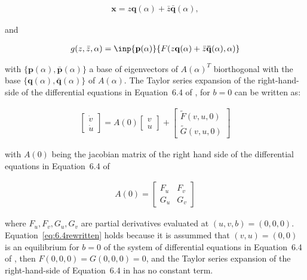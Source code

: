 \documentclass{article}
\theoremstyle{lemma}
\begin{document}
\begin{align}
\mathbf{x}=z\mathbf{q}(\alpha)+\bar{z}\mathbf{\bar{q}}(\alpha),
\label{eq:xExpandedOnz}
\end{align}

\noindent and 

\begin{align}
g(z,\bar{z},\alpha)=\inp{\mathbf{p}(\alpha)}{F(z\mathbf{q}(\alpha)+\bar{z}\mathbf{\bar{q}}(\alpha),\alpha)}\label{eq:gAtz}
\end{align}

\noindent with $\{\mathbf{p}(\alpha),\mathbf{\bar{p}}(\alpha)\}$ a base of
eigenvectors of $A(\alpha)^T$ biorthogonal with the base
$\{\mathbf{q}(\alpha),\mathbf{\bar{q}}(\alpha)\}$ of $A(\alpha)$.
The Taylor series expansion of the right-hand-side of the differential
equations in Equation~6.4 of \citet{izhikevich07}, for $b=0$
can be written as:

\begin{align}
\left[\begin{array}{c}
        \dot{v}\\
        \dot{u}
       \end{array}\right] = A(0) \left[\begin{array}{c}
                                         v\\
                                         u
                                        \end{array}\right] +
                            \left[\begin{array}{c}
                                    \tilde{F}(v, u, 0)\\
                                    \tilde{G}(v, u, 0)
                                   \end{array}\right]
\label{eq:6.4rewritten}
\end{align}

\noindent with $A(0)$ being the jacobian matrix of the right hand side of the
differential equations in Equation~6.4 of \citet{izhikevich07}

\begin{align}
A(0)=\left[\begin{array}{cc}
                F_u & F_v\\
                G_u & G_v
           \end{array}\right]
\label{eq:jacobian}
\end{align}

\noindent where $F_u,F_v,G_u,G_v$ are partial derivatives evaluated at
$(u,v,b)=(0,0,0)$. Equation~\ref{eq:6.4rewritten} holds because it is assummed
that $(v,u)=(0,0)$ is an equilibrium for $b=0$ of the system of differential
equations in Equation~6.4 of \citet{izhikevich07}, then
$F(0,0,0)=G(0,0,0)=0$, and the Taylor series expansion of the right-hand-side
of Equation~6.4 in \citet{izhikevich07} has no constant term.
\end{document}

